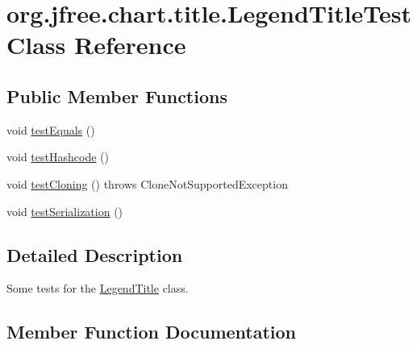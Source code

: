 \hypertarget{classorg_1_1jfree_1_1chart_1_1title_1_1_legend_title_test}{}\section{org.\+jfree.\+chart.\+title.\+Legend\+Title\+Test Class Reference}
\label{classorg_1_1jfree_1_1chart_1_1title_1_1_legend_title_test}
\subsection*{Public Member Functions}
\begin{DoxyCompactItemize}
\item 
void \mbox{\hyperlink{classorg_1_1jfree_1_1chart_1_1title_1_1_legend_title_test_ac1a3a97cbed28a633f04a9da8c9a1f67}{test\+Equals}} ()
\item 
void \mbox{\hyperlink{classorg_1_1jfree_1_1chart_1_1title_1_1_legend_title_test_a29bd4094b9f36e12e567b2638ed9265c}{test\+Hashcode}} ()
\item 
void \mbox{\hyperlink{classorg_1_1jfree_1_1chart_1_1title_1_1_legend_title_test_a16bf3800c673e244c4192890f22d528a}{test\+Cloning}} ()  throws Clone\+Not\+Supported\+Exception 
\item 
void \mbox{\hyperlink{classorg_1_1jfree_1_1chart_1_1title_1_1_legend_title_test_a825b63faafd8d94f41f6ca4fc70dca4f}{test\+Serialization}} ()
\end{DoxyCompactItemize}


\subsection{Detailed Description}
Some tests for the \mbox{\hyperlink{classorg_1_1jfree_1_1chart_1_1title_1_1_legend_title}{Legend\+Title}} class. 

\subsection{Member Function Documentation}
\mbox{\label{classorg_1_1jfree_1_1chart_1_1title_1_1_legend_title_test_a16bf3800c673e244c4192890f22d528a}} 
